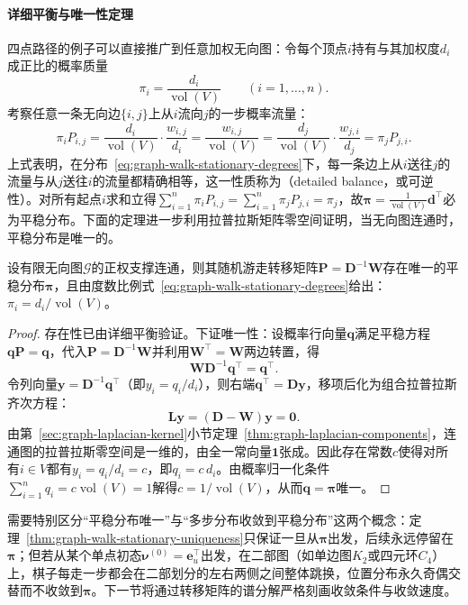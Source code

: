 \paragraph{详细平衡与唯一性定理}

四点路径的例子可以直接推广到任意加权无向图：令每个顶点$i$持有与其加权度$d_i$成正比的概率质量
\begin{equation}
\pi_i=\frac{d_i}{\operatorname{vol}(V)}\qquad(i=1,\ldots,n).
\label{eq:graph-walk-stationary-degrees}
\end{equation}
考察任意一条无向边$\{i,j\}$上从$i$流向$j$的一步概率流量：
\[
\pi_i P_{i,j}=\frac{d_i}{\operatorname{vol}(V)}\cdot\frac{w_{i,j}}{d_i}
=\frac{w_{i,j}}{\operatorname{vol}(V)}=\frac{d_j}{\operatorname{vol}(V)}\cdot\frac{w_{j,i}}{d_j}=\pi_j P_{j,i}.
\]
上式表明，在分布~\eqref{eq:graph-walk-stationary-degrees}下，每一条边上从$i$送往$j$的流量与从$j$送往$i$的流量都精确相等，这一性质称为（detailed balance，或可逆性）。对所有起点$i$求和立得$\sum_{i=1}^n\pi_i P_{i,j}=\sum_{i=1}^n\pi_j P_{j,i}=\pi_j$，故$\bm\pi=\frac{1}{\operatorname{vol}(V)}\bm d^\top$必为平稳分布。下面的定理进一步利用拉普拉斯矩阵零空间证明，当无向图连通时，平稳分布是唯一的。

\begin{theorem}[无向连通图平稳分布的存在唯一性]
\label{thm:graph-walk-stationary-uniqueness}
设有限无向图$\mathcal G$的正权支撑连通，则其随机游走转移矩阵$\bm P=\bm D^{-1}\bm W$存在唯一的平稳分布$\bm\pi$，且由度数比例式~\eqref{eq:graph-walk-stationary-degrees}给出：$\pi_i=d_i/\operatorname{vol}(V)$。
\end{theorem}

\begin{proof}
存在性已由详细平衡验证。下证唯一性：设概率行向量$\bm q$满足平稳方程$\bm q\bm P=\bm q$，代入$\bm P=\bm D^{-1}\bm W$并利用$\bm W^\top=\bm W$两边转置，得
\[
\bm{W}\bm{D}^{-1}\bm{q}^\top=\bm{q}^\top.
\]
令列向量$\bm{y}=\bm{D}^{-1}\bm{q}^\top$（即$y_i=q_i/d_i$），则右端$\bm q^\top=\bm D\bm y$，移项后化为组合拉普拉斯齐次方程：
\[
\bm L\bm y = (\bm{D}-\bm{W})\bm{y}=\bm{0}.
\]
由第~\ref{sec:graph-laplacian-kernel}小节定理~\ref{thm:graph-laplacian-components}，连通图的拉普拉斯零空间是一维的，由全一常向量$\bm 1$张成。因此存在常数$c$使得对所有$i\in V$都有$y_i=q_i/d_i=c$，即$q_i=c\,d_i$。由概率归一化条件$\sum_{i=1}^n q_i=c\operatorname{vol}(V)=1$解得$c=1/\operatorname{vol}(V)$，从而$\bm q=\bm\pi$唯一。
\end{proof}

需要特别区分“平稳分布唯一”与“多步分布收敛到平稳分布”这两个概念：定理~\ref{thm:graph-walk-stationary-uniqueness}只保证一旦从$\bm\pi$出发，后续永远停留在$\bm\pi$；但若从某个单点初态$\bm\nu^{(0)}=\bm e_u^\top$出发，在二部图（如单边图$K_2$或四元环$C_4$）上，棋子每走一步都会在二部划分的左右两侧之间整体跳换，位置分布永久奇偶交替而不收敛到$\bm\pi$。下一节将通过转移矩阵的谱分解严格刻画收敛条件与收敛速度。
